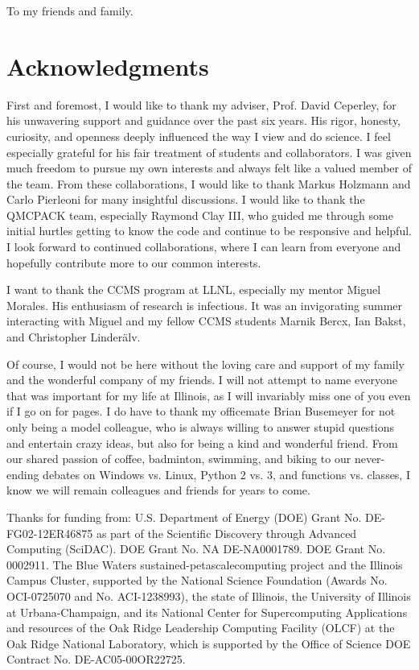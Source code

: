 \begin{dedication}
To my friends and family.
\end{dedication}

\chapter*{Acknowledgments}
First and foremost, I would like to thank my adviser, Prof. David Ceperley, for his unwavering support and guidance over the past six years.
His rigor, honesty, curiosity, and openness deeply influenced the way I view and do science.
I feel especially grateful for his fair treatment of students and collaborators.
I was given much freedom to pursue my own interests and always felt like a valued member of the team.
From these collaborations, I would like to thank Markus Holzmann and Carlo Pierleoni for many insightful discussions.
I would like to thank the QMCPACK team, especially Raymond Clay III, who guided me through some initial hurtles getting to know the code and continue to be responsive and helpful.
I look forward to continued collaborations, where I can learn from everyone and hopefully contribute more to our common interests.

I want to thank the CCMS program at LLNL, especially my mentor Miguel Morales.
His enthusiasm of research is infectious.
It was an invigorating summer interacting with Miguel and my fellow CCMS students Marnik Bercx, Ian Bakst, and Christopher Linder\"alv.

Of course, I would not be here without the loving care and support of my family and the wonderful company of my friends. I will not attempt to name everyone that was important for my life at Illinois, as I will invariably miss one of you even if I go on for pages.
I do have to thank my officemate Brian Busemeyer for not only being a model colleague, who is always willing to answer stupid questions and entertain crazy ideas, but also for being a kind and wonderful friend.
From our shared passion of coffee, badminton, swimming, and biking to our never-ending debates on Windows vs. Linux, Python 2 vs. 3, and functions vs. classes, I know we will remain colleagues and friends for years to come.

Thanks for funding from:
U.S. Department of Energy (DOE) Grant No. DE-FG02-12ER46875 as part of the Scientific Discovery through Advanced Computing (SciDAC). DOE Grant No. NA DE-NA0001789. DOE Grant No. 0002911. The Blue Waters sustained-petascalecomputing project and the Illinois Campus Cluster, supported by the National Science Foundation (Awards No. OCI-0725070 and No. ACI-1238993), the state of Illinois, the University of Illinois at Urbana-Champaign, and its National Center for Supercomputing Applications and resources of the Oak Ridge Leadership Computing Facility (OLCF) at the Oak  Ridge National Laboratory, which is supported by the Office of Science DOE Contract No. DE-AC05-00OR22725.
